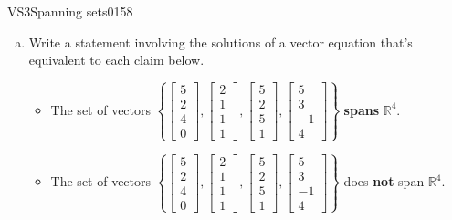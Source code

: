 \begin{exercise}{VS3}{Spanning sets}{0158} 
\begin{exerciseStatement} 

\begin{enumerate}[(a)]
\item  

 Write a statement involving the solutions of a vector equation that's equivalent to each claim below. 

 

\begin{itemize}
\item  

 The set of vectors \(\left\{ \left[\begin{array}{c}
5 \\
2 \\
4 \\
0
\end{array}\right] , \left[\begin{array}{c}
2 \\
1 \\
1 \\
1
\end{array}\right] , \left[\begin{array}{c}
5 \\
2 \\
5 \\
1
\end{array}\right] , \left[\begin{array}{c}
5 \\
3 \\
-1 \\
4
\end{array}\right] \right\}\) \textbf{spans} \(\mathbb R^4\). 

 
\item  

 The set of vectors \(\left\{ \left[\begin{array}{c}
5 \\
2 \\
4 \\
0
\end{array}\right] , \left[\begin{array}{c}
2 \\
1 \\
1 \\
1
\end{array}\right] , \left[\begin{array}{c}
5 \\
2 \\
5 \\
1
\end{array}\right] , \left[\begin{array}{c}
5 \\
3 \\
-1 \\
4
\end{array}\right] \right\}\) does \textbf{not} span \(\mathbb R^4\). 


\end{itemize}
\end{enumerate}
\end{exerciseStatement}
\end{exercise}
